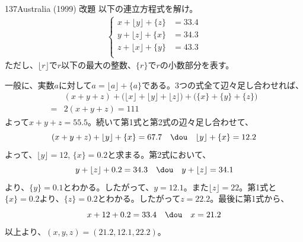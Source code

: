 \begin{prob}{137}{\maru}{Australia (1999) 改題}
 以下の連立方程式を解け。
 \begin{align*}
  \left\{
  \begin{aligned}
   x+\lfloor y \rfloor + \{z\} &= 33.4 \\
   y+\lfloor z \rfloor + \{x\} &= 34.3 \\
   z+\lfloor x \rfloor + \{y\} &= 43.3 \\
  \end{aligned}
  \right.
 \end{align*}
 ただし、$\lfloor r \rfloor$で$r$以下の最大の整数、$\{r\}$で$r$の小数部分を表す。
\end{prob}

一般に、実数$a$に対して$a=\lfloor a \rfloor+ \{a\}$である。3つの式全て辺々足し合わせれば、
\begin{align*}
 &(x+y+z)+\bigl(\lfloor x\rfloor+\lfloor y\rfloor +\lfloor z\rfloor\bigr) + \bigl(\{x\}+\{y\}+\{z\}\bigr) \\
 =&2(x+y+z)= 111
\end{align*}
よって$x+y+z=55.5$。続いて第1式と第2式の辺々足し合わせて、
\[ (x+y+z)+\lfloor y\rfloor+\{x\}=67.7 \quad\dou\quad \lfloor y\rfloor+\{x\}=12.2 \]
よって、$\lfloor y\rfloor=12$, $\{x\}=0.2$と求まる。第2式において、
\[ y+\lfloor z\rfloor + 0.2=34.3 \quad\dou\quad y+\lfloor z\rfloor =34.1 \]
より、$\{y\}=0.1$とわかる。したがって、$y=12.1$。また$\lfloor z\rfloor=22$。第1式と$\{x\}=0.2$より、$\{z\}=0.2$とわかる。したがって$z=22.2$。最後に第1式から、
\[ x+12+0.2=33.4 \quad\dou\quad x=21.2 \]
以上より、$(x, y, z)=(21.2, 12.1, 22.2)$。